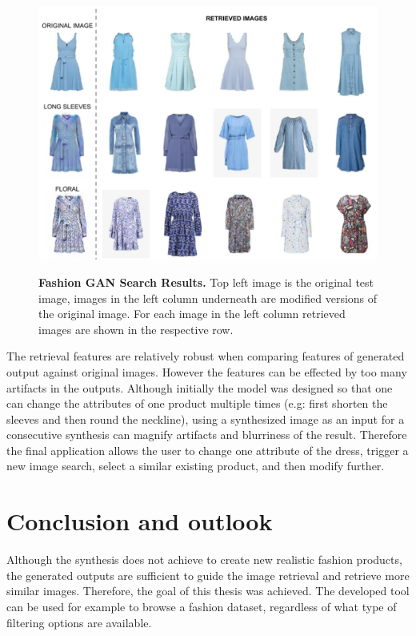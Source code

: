 \documentclass[12pt]{report}
\begin{document}
\begin{figure}[h]
\centering
{\includegraphics[width=.8\linewidth]{05_results/gan_search}}
\caption{\label{fig:pipeline_images} \textbf{Fashion GAN Search Results.} Top left image is the original test image, images in the left column underneath are modified versions of the original image. For each image in the left column retrieved images are shown in the respective row.}
\end{figure}

The retrieval features are relatively robust when comparing features of generated output against original images. However the features can be effected by too many artifacts in the outputs.  Although initially the model was designed so that one can change the attributes of one product multiple times (e.g: first shorten the sleeves and then round the neckline), using a synthesized image as an input for a consecutive synthesis can magnify artifacts and blurriness of the result. Therefore the final application allows the user to change one attribute of the dress, trigger a new image search, select a similar existing product, and then modify further.



\chapter{Conclusion and outlook}

Although the synthesis does not achieve to create new realistic fashion products, the generated outputs are sufficient to guide the image retrieval and retrieve more similar images. Therefore, the goal of this thesis was achieved. The developed tool can be used for example to browse a fashion dataset, regardless of what type of filtering options are available. 
\end{document}
